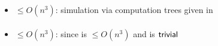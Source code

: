 \paragraph{\OMODLA{}\tto\TDFA}\label{cost:OM1DLAto2DFA}
\begin{itemize}
	\item $\le O(n^3)$: simulation via computation trees given in \cite{PigPri23a}
\end{itemize}
\paragraph{\OMODLA{}\tto\TNFA}
\begin{itemize}
	\item $\le O(n^3)$: since \hyperref[cost:OM1DLAto2DFA]{\OMODLA{}\tto\TDFA} is $\le O(n^3)$ and \TDFA{}\tto\TNFA is $\mathsf{trivial}$
\end{itemize}


